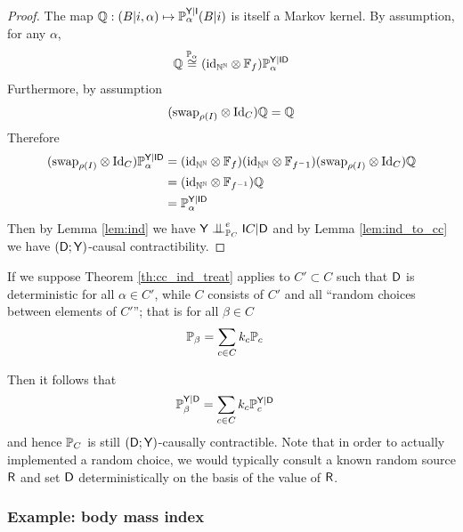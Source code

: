 \begin{proof}
The map $\mathbb{Q}:(B|i,\alpha)\mapsto \mathbb{P}_\alpha^{\mathsf{Y}|\mathsf{I}}(B|i)$ is itself a Markov kernel. By assumption, for any $\alpha$,
\begin{align}
    \mathbb{Q} \overset{\mathbb{P}_\alpha}{\cong} (\text{id}_{\mathbb{N}^\mathbb{N}}\otimes\mathbb{F}_f) \mathbb{P}_\alpha^{\mathsf{Y}|\mathsf{ID}}
\end{align}
Furthermore, by assumption
\begin{align}
    (\text{swap}_{\rho(I)}\otimes \text{Id}_{C} )\mathbb{Q} = \mathbb{Q}
\end{align}
Therefore
\begin{align}
    (\text{swap}_{\rho(I)}\otimes \text{Id}_{C} ) \mathbb{P}_\alpha^{\mathsf{Y}|\mathsf{ID}}&= (\text{id}_{\mathbb{N}^\mathbb{N}}\otimes\mathbb{F}_{f})(\text{id}_{\mathbb{N}^\mathbb{N}}\otimes\mathbb{F}_{f^-1})(\text{swap}_{\rho(I)}\otimes \text{Id}_{C} ) \mathbb{Q}\\
     &= (\text{id}_{\mathbb{N}^\mathbb{N}}\otimes\mathbb{F}_{f^{-1}}) \mathbb{Q}\\
     &= \mathbb{P}_\alpha^{\mathsf{Y}|\mathsf{ID}}
\end{align}
Then by Lemma \ref{lem:ind} we have $\RV{Y}\CI_{\prob{P}_C}^e \RV{I}C|\RV{D}$ and by Lemma \ref{lem:ind_to_cc} we have $(\mathsf{D};\mathsf{Y})$-causal contractibility.
\end{proof}

If we suppose Theorem \ref{th:cc_ind_treat} applies to $C'\subset C$ such that $\mathsf{D}$ is deterministic for all $\alpha\in C'$, while $C$ consists of $C'$ and all ``random choices between elements of $C'$''; that is for all $\beta\in C$
\begin{align}
    \mathbb{P}_\beta &= \sum_{c\in C} k_c \mathbb{P}_c 
\end{align} 

Then it follows that
\begin{align}
    \mathbb{P}_\beta^{\mathsf{Y}|\mathsf{D}} &= \sum_{c\in C} k_c \mathbb{P}_c^{\mathsf{Y}|\mathsf{D}}
\end{align}
and hence $\mathbb{P}_C$ is still $(\mathsf{D};\mathsf{Y})$-causally contractible. Note that in order to actually implemented a random choice, we would typically consult a known random source $\mathsf{R}$ and set $\mathsf{D}$ deterministically on the basis of the value of $\mathsf{R}$.

\subsubsection{Example: body mass index}

